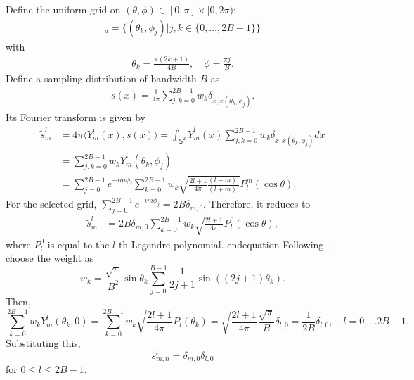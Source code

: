 \documentclass[onecolumn,11pt]{IEEEtran}
\newcommand{\pair}[1]{\ensuremath{\langle #1 \rangle}}
\newcommand{\Sph}{\ensuremath{\mathsf{S}}}
\begin{document}
Define the uniform grid on $(\theta,\phi)\in[0,\pi]\times [0, 2\pi)$:
\begin{align*}
    [\Sph^2]_d = \{(\theta_k,\phi_j)| j,k\in\{0,\ldots, 2B-1\}\}
\end{align*}
with
\begin{align*}
    \theta_k = \frac{\pi(2k+1)}{4B}, \quad \phi = \frac{\pi j}{B}.
\end{align*}
Define a sampling distribution of bandwidth $B$ as
\begin{align*}
    s(x) = \frac{1}{4\pi} \sum_{j,k=0}^{2B-1} w_k \delta_{x,x(\theta_k,\phi_j)}.
\end{align*}
Its Fourier transform is given by
\begin{align*}
    \tilde s^l_m & = 4\pi \pair{  Y^l_m(x), s(x) } = \int_{\Sph^2} \overline{Y}^l_m(x) \sum_{j,k=0}^{2B-1} w_k \delta_{x,x(\theta_k,\phi_j)} dx\\
                 & = \sum_{j,k=0}^{2B-1} w_k \overline{Y}^l_m(\theta_k,\phi_j)\\
                 & = \sum_{j=0}^{2B-1} e^{-im\phi_j} \sum_{k=0}^{2B-1} w_k \sqrt{\frac{2l+1}{4\pi}\frac{(l-m)!}{(l+m)!}} P^m_l(\cos\theta).
\end{align*}
For the selected grid, $\sum_{j=0}^{2B-1} e^{-im\phi_j}= 2B \delta_{m,0}$. 
Therefore, it reduces to
\begin{align*}
    \tilde s^l_m & = 2B\delta_{m,0} \sum_{k=0}^{2B-1} w_k \sqrt{\frac{2l+1}{4\pi}} P^0_l(\cos\theta),
\end{align*}
where $P^0_l$ is equal to the $l$-th Legendre polynomial. 
end{equation}
Following~\cite{DriHeaAAM94}, choose the weight as
\begin{equation}
    w_k = \frac{\sqrt{\pi}}{B^2}\sin\theta_k \sum_{j=0}^{B-1} \frac{1}{2j+1}\sin((2j+1)\theta_k).
\end{equation}
Then,
\begin{equation}
    \sum_{k=0}^{2B-1} w_k Y^l_m(\theta_k,0) = \sum_{k=0}^{2B-1} w_k \sqrt{\frac{2l+1}{4\pi}} P_l(\theta_k) =\sqrt{\frac{2l+1}{4\pi}} \frac{\sqrt{\pi}}{B} \delta_{l,0}=\frac{1}{2B} \delta_{l,0},\quad l=0,\ldots 2B-1.
\end{equation}
Substituting this,
\begin{equation}
    \bar s ^l_{m,n} = \delta_{m,0}\delta_{l,0}
\end{equation}
for $0\leq l\leq 2B-1$. 
\end{document}
